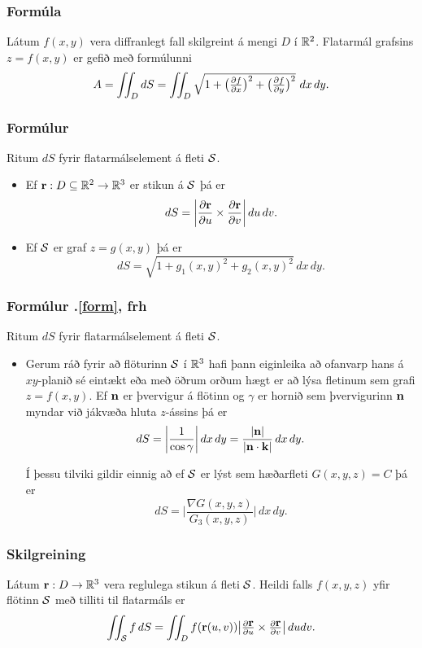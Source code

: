 \subsubsection{Formúla \rtask{}}
 Látum $f(x,y)$ vera diffranlegt fall skilgreint á
mengi $D$ í ${\mathbb R}^2$.  Flatarmál grafsins $z=f(x,y)$ er gefið með
formúlunni 
$$A=\int\!\!\!\int_D dS=\int\!\!\!\int_D {\textstyle\sqrt{1+
\big(\frac{\partial f}{\partial x}\big)^2+
\big(\frac{\partial f}{\partial y}\big)^2}}\,\,dx\,dy.$$



\subsubsection{Formúlur }

 Ritum $dS$ fyrir flatarmálselement á fleti $\cal S$.  
\begin{itemize}
\item Ef $\mbox{${\bf r}$}:D\subseteq{\mathbb R}^2\rightarrow {\mathbb R}^3$ er stikun á $\cal S$ þá
  er $$dS=\bigg|\frac{\partial \mbox{${\bf r}$}}{\partial u}\times\frac{\partial
  \mbox{${\bf r}$}}{\partial v}\bigg|\,du\,dv.$$
\item Ef $\cal S$ er graf $z=g(x,y)$ þá er 
$$dS=\sqrt{1+g_1(x,y)^2+g_2(x,y)^2}\,dx\,dy.$$


\end{itemize}



\subsubsection{Formúlur \kaflanr.\ref{form}, frh}

 Ritum $dS$ fyrir flatarmálselement á fleti $\cal S$.  
\begin{itemize}
\item Gerum ráð fyrir að flöturinn $\cal S$ í ${\mathbb R}^3$ hafi þann eiginleika að
  ofanvarp hans á $xy$-planið sé eintækt eða með öðrum orðum hægt er
  að lýsa fletinum sem grafi $z=f(x,y)$.
Ef $\mbox{${\bf n}$}$ er þvervigur á
flötinn og $\gamma$ er hornið sem þvervigurinn $\mbox{${\bf n}$}$ myndar við
jákvæða hluta $z$-ássins þá er 
$$dS=\bigg|\frac{1}{\cos\gamma}\bigg|\,dx\,dy
=\frac{|\mbox{${\bf n}$}|}{|\mbox{${\bf n}$}\cdot\mbox{${\bf k}$}|}\,dx\,dy.$$

Í þessu tilviki gildir einnig að ef $\cal S$ er lýst sem 
hæðarfleti $G(x,y,z)=C$ þá er 
$$dS=\bigg|\frac{\nabla G(x,y,z)}{G_3(x,y,z)}\bigg|\,dx\,dy.$$
\end{itemize}






\subsubsection{Skilgreining \rtask{}}
 Látum $\mbox{${\bf r}$}: D\rightarrow {\mathbb R}^3$ vera
reglulega stikun á fleti $\cal S$.   
Heildi falls $f(x,y,z)$ yfir flötinn $\cal S$ með tilliti til flatarmáls er
$$\int\!\!\!\int_{\cal S} f\,dS=\int\!\!\!\int_D f(\mbox{${\bf r}$}(u,v)) \big|{\textstyle\frac{\partial
    \mbox{${\bf r}$}}{\partial u} 
\times\frac{\partial \mbox{${\bf r}$}}{\partial v}}\big|\,dudv.$$



